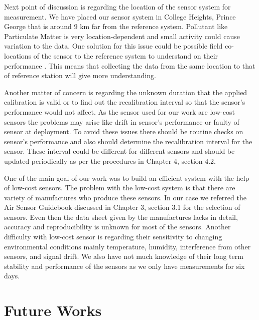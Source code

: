 Next point of discussion is regarding the location of the sensor system for measurement. We have placed our sensor system in College Heights, Prince George that is around 9 km far from the reference system. Pollutant like Particulate Matter is very location-dependent and small activity could cause variation to the data. One solution for this issue could be possible field co-locations of the sensor to the reference system to understand on their performance \cite{austin2015laboratory}. This means that collecting the data from the same location to that of reference station will give more understanding. 

Another matter of concern is regarding the unknown duration that the applied calibration is valid or to find out the recalibration interval so that the sensor's performance would not affect. As the sensor used for our work are low-cost sensors the problems may arise like drift in sensor's performance or faulty of sensor at deployment. To avoid these issues there should be routine checks on sensor's performance and also should determine the recalibration interval for the sensor. These interval could be different for different sensors and should be updated periodically as per the procedures in Chapter 4, section 4.2.


One of the main goal of our work was to build an efficient system with the help of low-cost sensors. The problem with the low-cost system is that there are variety of manufactures who produce these sensors. In our case we referred the Air Sensor Guidebook discussed in Chapter 3, section 3.1 for the selection of sensors. Even then the data sheet given by the manufactures lacks in detail, accuracy and reproducibility is unknown for most of the sensors. Another difficulty with low-cost sensor is regarding their sensitivity to changing environmental conditions mainly temperature, humidity, interference from other sensors, and signal drift. We also have not much knowledge of their long term stability and performance of the sensors as we only have measurements for six days. 









\section{Future Works}

